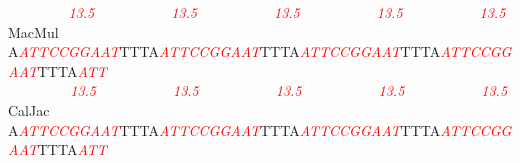 \documentclass[11pt,twoside,reqno,a4paper]{article}
\begin{document}
{\textcolor{white}{PonAbe	}\ \textit{\textcolor{red}{13.5}}\ \ \ \ \ \ \ \ \ \ \ \textit{\textcolor{red}{13.5}}\ \ \ \ \ \ \ \ \ \ \ \textit{\textcolor{red}{13.5}}\ \ \ \ \ \ \ \ \ \ \ \textit{\textcolor{red}{13.5}}\ \ \ \ \ \ \ \ \ \ \ \textit{\textcolor{red}{13.5}}\\
MacMul	A\textit{\textcolor{red}{A}}\textit{\textcolor{red}{T}}\textit{\textcolor{red}{T}}\textit{\textcolor{red}{C}}\textit{\textcolor{red}{C}}\textit{\textcolor{red}{G}}\textit{\textcolor{red}{G}}\textit{\textcolor{red}{A}}\textit{\textcolor{red}{A}}\textit{\textcolor{red}{T}}TTTA\textit{\textcolor{red}{A}}\textit{\textcolor{red}{T}}\textit{\textcolor{red}{T}}\textit{\textcolor{red}{C}}\textit{\textcolor{red}{C}}\textit{\textcolor{red}{G}}\textit{\textcolor{red}{G}}\textit{\textcolor{red}{A}}\textit{\textcolor{red}{A}}\textit{\textcolor{red}{T}}TTTA\textit{\textcolor{red}{A}}\textit{\textcolor{red}{T}}\textit{\textcolor{red}{T}}\textit{\textcolor{red}{C}}\textit{\textcolor{red}{C}}\textit{\textcolor{red}{G}}\textit{\textcolor{red}{G}}\textit{\textcolor{red}{A}}\textit{\textcolor{red}{A}}\textit{\textcolor{red}{T}}TTTA\textit{\textcolor{red}{A}}\textit{\textcolor{red}{T}}\textit{\textcolor{red}{T}}\textit{\textcolor{red}{C}}\textit{\textcolor{red}{C}}\textit{\textcolor{red}{G}}\textit{\textcolor{red}{G}}\textit{\textcolor{red}{A}}\textit{\textcolor{red}{A}}\textit{\textcolor{red}{T}}TTTA\textit{\textcolor{red}{A}}\textit{\textcolor{red}{T}}\textit{\textcolor{red}{T}}\\
\textcolor{white}{MacMul	}\ \textit{\textcolor{red}{13.5}}\ \ \ \ \ \ \ \ \ \ \ \textit{\textcolor{red}{13.5}}\ \ \ \ \ \ \ \ \ \ \ \textit{\textcolor{red}{13.5}}\ \ \ \ \ \ \ \ \ \ \ \textit{\textcolor{red}{13.5}}\ \ \ \ \ \ \ \ \ \ \ \textit{\textcolor{red}{13.5}}\\
CalJac	A\textit{\textcolor{red}{A}}\textit{\textcolor{red}{T}}\textit{\textcolor{red}{T}}\textit{\textcolor{red}{C}}\textit{\textcolor{red}{C}}\textit{\textcolor{red}{G}}\textit{\textcolor{red}{G}}\textit{\textcolor{red}{A}}\textit{\textcolor{red}{A}}\textit{\textcolor{red}{T}}TTTA\textit{\textcolor{red}{A}}\textit{\textcolor{red}{T}}\textit{\textcolor{red}{T}}\textit{\textcolor{red}{C}}\textit{\textcolor{red}{C}}\textit{\textcolor{red}{G}}\textit{\textcolor{red}{G}}\textit{\textcolor{red}{A}}\textit{\textcolor{red}{A}}\textit{\textcolor{red}{T}}TTTA\textit{\textcolor{red}{A}}\textit{\textcolor{red}{T}}\textit{\textcolor{red}{T}}\textit{\textcolor{red}{C}}\textit{\textcolor{red}{C}}\textit{\textcolor{red}{G}}\textit{\textcolor{red}{G}}\textit{\textcolor{red}{A}}\textit{\textcolor{red}{A}}\textit{\textcolor{red}{T}}TTTA\textit{\textcolor{red}{A}}\textit{\textcolor{red}{T}}\textit{\textcolor{red}{T}}\textit{\textcolor{red}{C}}\textit{\textcolor{red}{C}}\textit{\textcolor{red}{G}}\textit{\textcolor{red}{G}}\textit{\textcolor{red}{A}}\textit{\textcolor{red}{A}}\textit{\textcolor{red}{T}}TTTA\textit{\textcolor{red}{A}}\textit{\textcolor{red}{T}}\textit{\textcolor{red}{T}}\\
}
\end{document}
